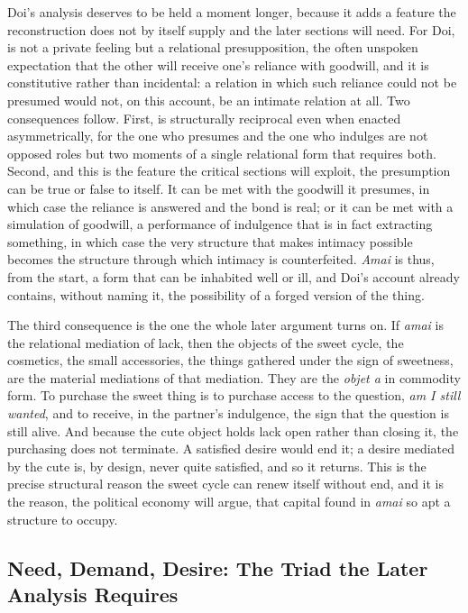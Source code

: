 Doi's analysis deserves to be held a moment longer, because it adds a feature the reconstruction does not by itself supply and the later sections will need. For Doi,  is not a private feeling but a relational presupposition, the often unspoken expectation that the other will receive one's reliance with goodwill, and it is constitutive rather than incidental: a relation in which such reliance could not be presumed would not, on this account, be an intimate relation at all. Two consequences follow. First,  is structurally reciprocal even when enacted asymmetrically, for the one who presumes and the one who indulges are not opposed roles but two moments of a single relational form that requires both. Second, and this is the feature the critical sections will exploit, the presumption can be true or false to itself. It can be met with the goodwill it presumes, in which case the reliance is answered and the bond is real; or it can be met with a simulation of goodwill, a performance of indulgence that is in fact extracting something, in which case the very structure that makes intimacy possible becomes the structure through which intimacy is counterfeited. \textit{Amai} is thus, from the start, a form that can be inhabited well or ill, and Doi's account already contains, without naming it, the possibility of a forged version of the thing.

The third consequence is the one the whole later argument turns on. If \textit{amai} is the relational mediation of lack, then the objects of the sweet cycle, the cosmetics, the small accessories, the things gathered under the sign of sweetness, are the material mediations of that mediation. They are the \textit{objet a} in commodity form. To purchase the sweet thing is to purchase access to the question, \textit{am I still wanted}, and to receive, in the partner's indulgence, the sign that the question is still alive. And because the cute object holds lack open rather than closing it, the purchasing does not terminate. A satisfied desire would end it; a desire mediated by the cute is, by design, never quite satisfied, and so it returns. This is the precise structural reason the sweet cycle can renew itself without end, and it is the reason, the political economy will argue, that capital found in \textit{amai} so apt a structure to occupy.

\subsection{Need, Demand, Desire: The Triad the Later Analysis Requires}

